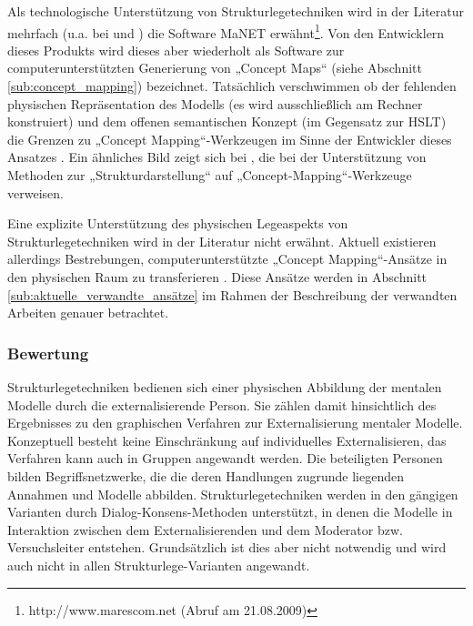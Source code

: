 Als technologische Unterstützung von Strukturlegetechniken wird in der Literatur mehrfach (u.a. bei \citep{Huss03} und \citep{Ifenthaler06}) die Software \gls{MaNET} \citep{Eckert98} erwähnt\footnote{http://www.marescom.net (Abruf am 21.08.2009)}. Von den Entwicklern dieses Produkts wird dieses aber wiederholt als Software zur computerunterstützten Generierung von „Concept Maps“ (siehe Abschnitt \ref{sub:concept_mapping}) bezeichnet. Tatsächlich verschwimmen ob der fehlenden physischen Repräsentation des Modells (es wird ausschließlich am Rechner konstruiert) und dem offenen semantischen Konzept (im Gegensatz zur \gls{HSLT}) die Grenzen zu „Concept Mapping“-Werkzeugen im Sinne der Entwickler dieses Ansatzes \citep{Novak06}. Ein ähnliches Bild zeigt sich bei \citet{Mandl00}, die bei der Unterstützung von Methoden zur „Strukturdarstellung“ auf „Concept-Mapping“-Werkzeuge verweisen.

Eine explizite Unterstützung des physischen Legeaspekts von Strukturlegetechniken wird in der Literatur nicht erwähnt. Aktuell existieren allerdings Bestrebungen, computerunterstützte „Concept Mapping“-Ansätze in den physischen Raum zu transferieren \citep{Do-Lenh09} \citep{Tanenbaum09}. Diese Ansätze werden in Abschnitt \ref{sub:aktuelle_verwandte_ansätze} im Rahmen der Beschreibung der verwandten Arbeiten genauer betrachtet.

\subsubsection{Bewertung}

Strukturlegetechniken bedienen sich einer physischen Abbildung der mentalen Modelle durch die externalisierende Person. Sie zählen damit hinsichtlich des Ergebnisses zu den graphischen Verfahren zur Externalisierung mentaler Modelle. Konzeptuell besteht keine Einschränkung auf individuelles Externalisieren, das Verfahren kann auch in Gruppen angewandt werden. Die beteiligten Personen bilden Begriffsnetzwerke, die die deren Handlungen zugrunde liegenden Annahmen und Modelle abbilden. Strukturlegetechniken werden in den gängigen Varianten durch Dialog-Konsens-Methoden unterstützt, in denen die Modelle in Interaktion zwischen dem Externalisierenden und dem Moderator bzw. Versuchsleiter entstehen. Grundsätzlich ist dies aber nicht notwendig und wird auch nicht in allen Strukturlege-Varianten angewandt.

